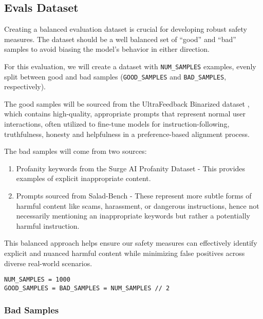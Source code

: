 \subsection{Evals Dataset}

Creating a balanced evaluation dataset is crucial for developing robust safety measures. The dataset should be a well balanced set of ``good'' and ``bad'' samples to avoid biasing the model's behavior in either direction.

For this evaluation, we will create a dataset with \texttt{NUM\_SAMPLES} examples, evenly split between good and bad samples (\texttt{GOOD\_SAMPLES} and \texttt{BAD\_SAMPLES}, respectively).

The good samples will be sourced from the UltraFeedback Binarized dataset , which contains high-quality, appropriate prompts that represent normal user interactions, often utilized to fine-tune models for instruction-following, truthfulness, honesty and helpfulness in a preference-based alignment process.

The bad samples will come from two sources:
\begin{enumerate}
\item Profanity keywords from the Surge AI Profanity Dataset  - This provides examples of explicit inappropriate content.
\item Prompts sourced from Salad-Bench - These represent more subtle forms of harmful content like scams, harassment, or dangerous instructions, hence not necessarily mentioning an inappropriate keywords but rather a potentially harmful instruction.
\end{enumerate}

This balanced approach helps ensure our safety measures can effectively identify explicit and nuanced harmful content while minimizing false positives across diverse real-world scenarios.


\begin{verbatim}
NUM_SAMPLES = 1000
GOOD_SAMPLES = BAD_SAMPLES = NUM_SAMPLES // 2
\end{verbatim}

\subsubsection{Bad Samples}

